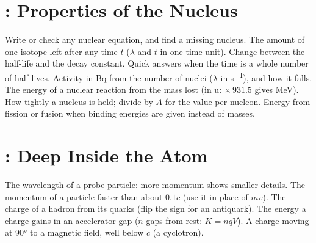 \section*{: Properties of the Nucleus}
\begin{formulatable}
    {Write or check any nuclear equation, and find a missing nucleus.}
    {The amount of one isotope left after any time $t$ ($\lambda$ and $t$ in one time
     unit).}
    {Change between the half-life and the decay constant.}
    {Quick answers when the time is a whole number of half-lives.}
    {Activity in Bq from the number of nuclei ($\lambda$ in \si{s^{-1}}), and how it falls.}
    {The energy of a nuclear reaction from the mass lost (in u: $\times\,931.5$ gives MeV).}
    {How tightly a nucleus is held; divide by $A$ for the value per nucleon.}
    {Energy from fission or fusion when binding energies are given instead of masses.}
\end{formulatable}

\section*{: Deep Inside the Atom}
\begin{formulatable}
    {The wavelength of a probe particle: more momentum shows smaller details.}
    {The momentum of a particle faster than about $0.1c$ (use it in place of $mv$).}
    {The charge of a hadron from its quarks (flip the sign for an antiquark).}
    {The energy a charge gains in an accelerator gap ($n$ gaps from rest: $K = nqV$).}
    {A charge moving at \ang{90} to a magnetic field, well below $c$ (a cyclotron).}
\end{formulatable}


